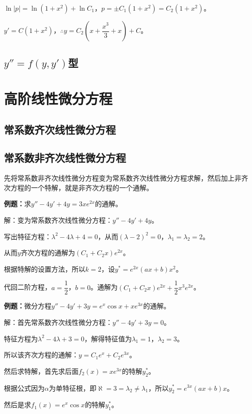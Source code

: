 \documentclass[UTF8, 12pt]{ctexart}
\begin{document}
$\ln\vert p\vert=\ln(1+x^2)+\ln C_1$，$p=\pm C_1(1+x^2)=C_2(1+x^2)$。

$y'=C(1+x^2)$，$\therefore y=C_2\left(x+\dfrac{x^3}{3}+x\right)+C$。

\subsection{\texorpdfstring{$y''=f(y,y')$}\ 型}

\section{高阶线性微分方程}

\subsection{常系数齐次线性微分方程}

\subsection{常系数非齐次线性微分方程}

先将常系数非齐次线性微分方程变为常系数齐次线性微分方程求解，然后加上非齐次方程的一个特解，就是非齐次方程的一个通解。

\textbf{例题：}求$y''-4y'+4y=3xe^{2x}$的通解。

解：变为常系数齐次线性微分方程：$y''-4y'+4y$。

写出特征方程：$\lambda^2-4\lambda+4=0$，从而$(\lambda-2)^2=0$，$\lambda_1=\lambda_2=2$。

从而$y$齐次方程的通解为$(C_1+C_2x)e^{2x}$。

根据特解的设置方法，所以$k=2$，设$y^*=e^{2x}(ax+b)x^2$。

代回二阶方程，$a=\dfrac{1}{2}$，$b=0$。通解为$(C_1+C_2x)e^{2x}+\dfrac{1}{2}x^3e^{2x}$。

\textbf{例题：}微分方程$y''-4y'+3y=e^x\cos x+xe^{3x}$的通解。

解：首先常系数齐次线性微分方程：$y''-4y'+3y=0$。

特征方程为$\lambda^2-4\lambda+3=0$，解得特征值为$\lambda_1=1$，$\lambda_2=3$。

所以该齐次方程的通解：$y=C_1e^x+C_2e^{3x}$。

然后求特解，首先求后面$f_2(x)=xe^{3x}$的特解$y_2^*$。

根据公式因为$\alpha$为单特征根，即$\aleph=3=\lambda_2\neq\lambda_1$，所以$y_2^*=e^{3x}(ax+b)x$。

然后是求$f_1(x)=e^x\cos x$的特解$y_1^*$。
\end{document}
